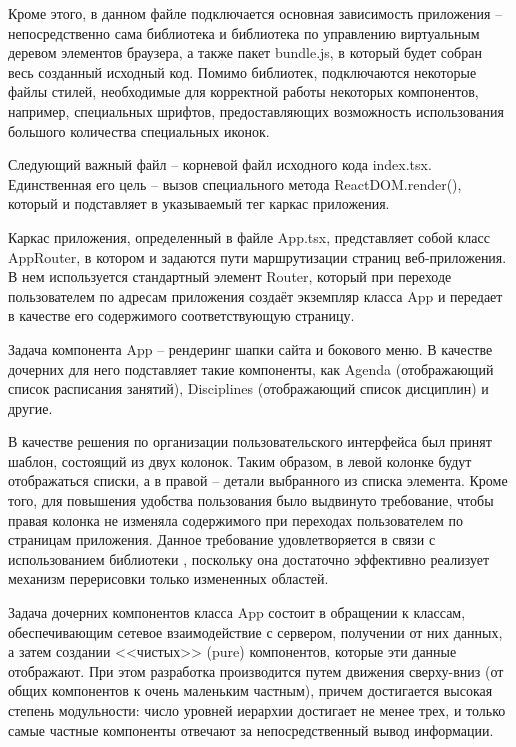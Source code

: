 Кроме этого, в данном файле подключается основная зависимость приложения -- непосредственно сама библиотека \react и библиотека по управлению виртуальным деревом элементов браузера, а также пакет bun\-dle.js, в который будет собран весь созданный исходный код. Помимо библиотек, подключаются некоторые файлы стилей, необходимые для корректной работы некоторых компонентов, например, специальных шрифтов, предоставляющих возможность использования большого количества специальных иконок.

Следующий важный файл -- корневой файл исходного \typescript кода index.tsx. Единственная его цель -- вызов специального метода React\-DOM.ren\-der(), который и подставляет в указываемый тег каркас приложения.

Каркас приложения, определенный в файле App.tsx, представляет собой класс AppRouter, в котором и задаются пути маршрутизации страниц веб-приложения. В нем используется стандартный элемент Router, который при переходе пользователем по адресам приложения создаёт экземпляр класса App и передает в качестве его содержимого соответствующую страницу.

Задача компонента App -- рендеринг шапки сайта и бокового меню. В качестве дочерних для него \react подставляет такие компоненты, как Agenda (отображающий список расписания занятий), Disciplines (отображающий список дисциплин) и другие.

В качестве решения по организации пользовательского интерфейса был принят шаблон, состоящий из двух колонок. Таким образом, в левой колонке будут отображаться списки, а в правой -- детали выбранного из списка элемента. Кроме того, для повышения удобства пользования было выдвинуто требование, чтобы правая колонка не изменяла содержимого при переходах пользователем по страницам приложения. Данное требование удовлетворяется в связи с использованием библиотеки \react, поскольку она достаточно эффективно реализует механизм перерисовки только измененных областей. 

Задача дочерних компонентов класса App состоит в обращении к классам, обеспечивающим сетевое взаимодействие с сервером, получении от них данных, а затем создании <<чистых>> (pure) компонентов, которые эти данные отображают. При этом разработка производится путем движения сверху-вниз (от общих компонентов к очень маленьким частным), причем достигается высокая степень модульности: число уровней иерархии достигает не менее трех, и только самые частные компоненты отвечают за непосредственный вывод информации.

